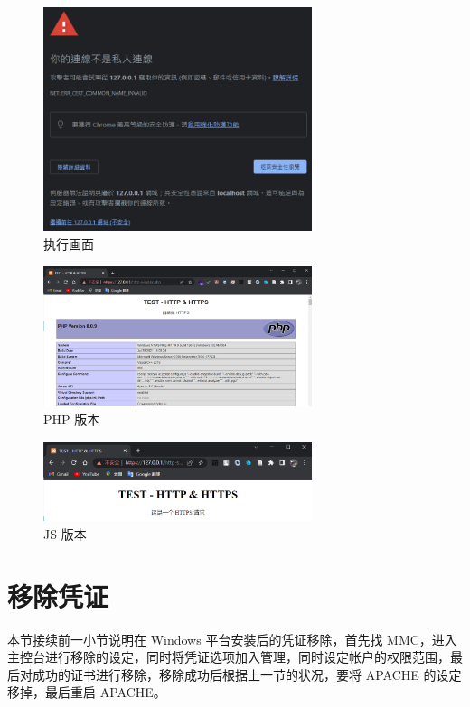 \begin{figure}[htb]
\centering 
\includegraphics[width=0.70\textwidth]{img/ch1s2m14.png} 
\caption{执行画面}
\label{Test}
\end{figure}

\begin{figure}[htb]
\centering 
\includegraphics[width=0.70\textwidth]{img/ch1s2m15.png} 
\caption{PHP 版本}
\label{Test}
\end{figure}

\begin{figure}[htb]
\centering 
\includegraphics[width=0.70\textwidth]{img/ch1s2m16.png} 
\caption{JS 版本}
\label{Test}
\end{figure}


\section{移除凭证}

本节接续前一小节说明在 Windows 平台安装后的凭证移除，首先找 MMC，进入主控台进行移除的设定，同时将凭证选项加入管理，同时设定帐户的权限范围，最后对成功的证书进行移除，移除成功后根据上一节的状况，要将 APACHE 的设定移掉，最后重启 APACHE。

